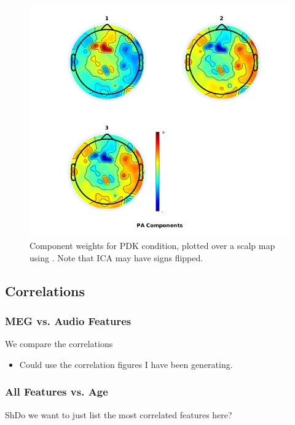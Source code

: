 \documentclass[a4paper]{article}
\begin{document}
\begin{figure}[t]
  \centering
  \includegraphics[width=\linewidth]{PA_components.png}
  \caption{Component weights for PDK condition, plotted over a scalp map using \cite{Delorme04eeglab}. Note that ICA may have signs flipped.}
  \label{fig:components} 
\end{figure}

\subsection{Correlations} 

\subsubsection{MEG vs. Audio Features}

We compare the correlations 

\begin{itemize}
\item Could use the correlation figures I have been generating.
\end{itemize}


\subsubsection{All Features vs. Age}

ShDo we want to just list the most correlated features here?
\end{document}
